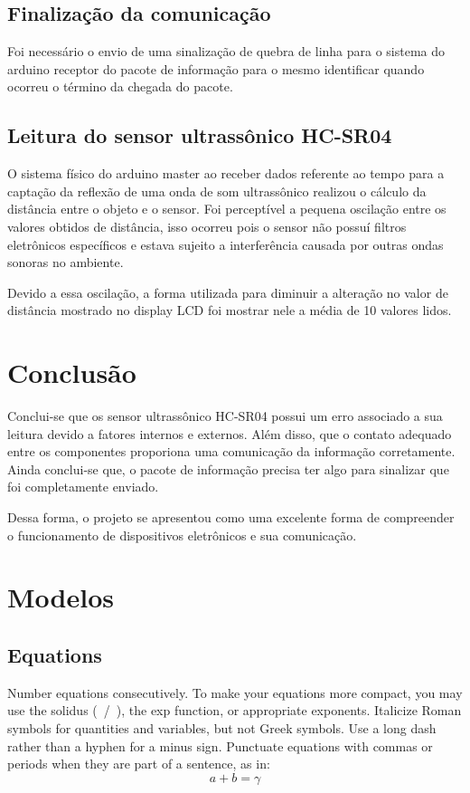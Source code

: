 \documentclass[conference]{IEEEtran}
\begin{document}
\subsection{Finalização da comunicação}
Foi necessário o envio de uma sinalização de quebra de linha para o sistema do arduino receptor do pacote de informação para o mesmo identificar quando ocorreu o término da chegada do pacote.

\subsection{Leitura do sensor ultrassônico HC-SR04}

O sistema físico do arduino master ao receber dados referente ao tempo para a captação da reflexão de uma onda de som ultrassônico realizou o cálculo da distância entre o objeto e o sensor.
Foi perceptível a pequena oscilação entre os valores obtidos de distância, isso ocorreu pois o sensor não possuí filtros eletrônicos específicos e estava sujeito a interferência causada por outras ondas sonoras no ambiente.

Devido a essa oscilação, a forma utilizada para diminuir a alteração no valor de distância mostrado no display LCD foi mostrar nele a média de 10 valores lidos.

\section{Conclusão}
Conclui-se que os sensor ultrassônico HC-SR04 possui um erro associado a sua leitura devido a fatores internos e externos.
Além disso, que o contato adequado entre os componentes proporiona uma comunicação da informação corretamente. Ainda conclui-se que, o pacote de informação precisa ter algo para sinalizar que foi completamente enviado.

Dessa forma, o projeto se apresentou como uma excelente forma de compreender o funcionamento de dispositivos eletrônicos e sua comunicação.










\section{Modelos}

\subsection{Equations}
Number equations consecutively. To make your
equations more compact, you may use the solidus (~/~), the exp function, or
appropriate exponents. Italicize Roman symbols for quantities and variables,
but not Greek symbols. Use a long dash rather than a hyphen for a minus
sign. Punctuate equations with commas or periods when they are part of a
sentence, as in:
\begin{equation}
    a+b=\gamma\label{eq}
\end{equation}
\end{document}
